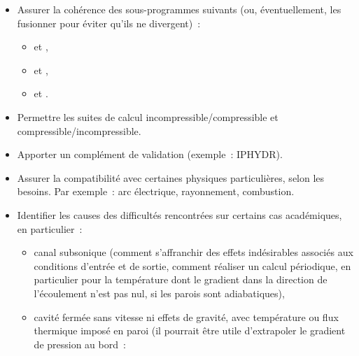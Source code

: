 \begin{itemize}
\item Assurer la coh\'erence des sous-programmes suivants (ou, \'eventuellement,
les fusionner pour \'eviter qu'ils ne divergent)~:
        \begin{itemize}
        \item {} et ,
        \item {} et ,
        \item {} et .
        \end{itemize}
\item Permettre les suites de calcul incompressible/compressible et
        compressible/incompressible.
\item Apporter un compl\'ement de validation (exemple~: IPHYDR).
\item Assurer la compatibilit\'e avec certaines physiques particuli\`eres, selon
        les besoins. Par exemple~: arc \'electrique, rayonnement, combustion.
\item Identifier les causes des difficult\'es rencontr\'ees sur certains cas
acad\'emiques, en particulier~:
        \begin{itemize}
        \item canal subsonique (comment s'affranchir des effets ind\'esirables
        associ\'es aux conditions d'entr\'ee et de sortie, comment r\'ealiser un
        calcul p\'eriodique, en particulier pour la temp\'erature dont le
        gradient dans la direction de l'\'ecoulement n'est pas nul, si
        les parois sont adiabatiques),
        \item cavit\'e ferm\'ee sans vitesse ni effets de gravit\'e,
        avec temp\'erature ou flux thermique impos\'e en paroi (il pourrait
        \^etre utile d'extrapoler le gradient de pression au bord~:

\end{itemize}
\end{itemize}
